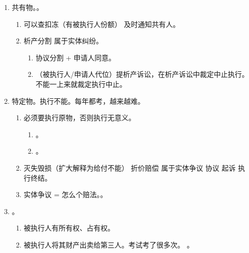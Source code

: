 \begin{enumerate}
\begin{enumerate}
\begin{enumerate}
                  \item 只能代位 1 次，不允许再代位。。
                \end{enumerate}
          \item 共有物。。
                \begin{enumerate}
                  \item 可以查扣冻（有被执行人份额） \yjt 及时通知共有人。
                  \item 析产分割 \yjt 属于实体纠纷。
                        \begin{enumerate}
                          \item 协议分割 + 申请人同意。
                          \item （被执行人/申请人代位）提析产诉讼，在析产诉讼中裁定中止执行。不能一上来就裁定执行中止。
                        \end{enumerate}
                \end{enumerate}
          \item 特定物。执行不能。每年都考，越来越难。
                \begin{enumerate}
                  \item 必须要执行原物，否则执行无意义。
                        \begin{enumerate}
                          \item {}。
                          \item {}。
                        \end{enumerate}
                  \item 灭失毁损（扩大解释为给付不能） \yjt 折价赔偿 \yjt 属于实体争议 \yjt 协议 \hz 起诉 \yjt 执行终结。
                  \item 实体争议 = 怎么个赔法。。
                \end{enumerate}
          \item {}。
                \begin{enumerate}
                  \item {} \yjt 被执行人有所有权、占有权。
                  \item 被执行人将其财产出卖给第三人。考试考了很多次。
                        。

\end{enumerate}
\end{enumerate}
\end{enumerate}
